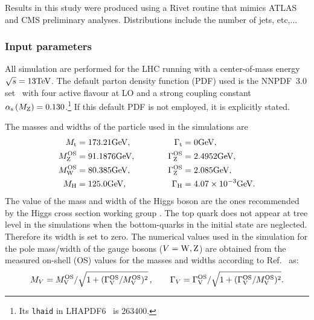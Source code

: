 \documentclass[11pt]{cernrep}
\begin{document}
Results in this study were produced using a Rivet routine that
mimics ATLAS and CMS preliminary analyses. Distributions include the number of jets, etc,...

\subsubsection*{Input parameters}

All simulation are performed for the LHC running with a center-of-mass energy $\sqrt s = 13 {\rm TeV}$.
The default parton density function (PDF) used is the NNPDF~3.0 set~\cite{Ball:2014uwa} with four active flavour at LO and a strong coupling constant $\alpha_{\rm s}\left( M_{\rm Z} \right) = 0.130$.\footnote{Its {\tt lhaid} in LHAPDF6~\cite{Buckley:2014ana} is 263400.} 
If this default PDF is not employed, it is explicitly stated.

The masses and widths of the particle used in the simulations are
%
\begin{alignat}{2}
                M_{\rm t}   &=  173.21 {\rm GeV},             & \quad \quad \quad \Gamma_{\rm t} &= 0 {\rm GeV},  \nonumber \\
                M_{\rm Z}^{\rm OS} &=  91.1876{\rm GeV},      & \quad \quad \quad \Gamma^{\rm OS}_{\rm Z} &= 2.4952{\rm GeV},  \nonumber \\
                M_{\rm W}^{\rm OS} &=  80.385{\rm GeV},       & \Gamma^{\rm OS}_{\rm Z} &= 2.085{\rm GeV},  \nonumber \\
                M_{\rm H} &=  125.0{\rm GeV}, 		      & \Gamma_{\rm H}   &=  4.07 \times 10^{-3}{\rm GeV}.
\end{alignat}
%
The value of the mass and width of the Higgs boson are the ones recommended by the Higgs cross section working group \cite{deFlorian:2016spz}.
The top quark does not appear at tree level in the simulations when the bottom-quarks in the initial state are neglected.
Therefore its width is set to zero.
The numerical values used in the simulation for the pole mass/width of the gauge bosons ($V={\rm W,Z}$) are obtained from the measured on-shell (OS) values for the masses and widths according to Ref.~\cite{Bardin:1988xt} as:
%
\begin{equation}
        M_V = M_{\rm V}^{\rm OS}/\sqrt{1+(\Gamma_{\rm V}^{\rm OS}/M_{\rm V}^{\rm OS})^2}\,,\qquad  \Gamma_V = \Gamma_{\rm V}^{\rm OS}/\sqrt{1+(\Gamma_{\rm V}^{\rm OS}/M_{\rm V}^{\rm OS})^2}.
\end{equation}
\end{document}

